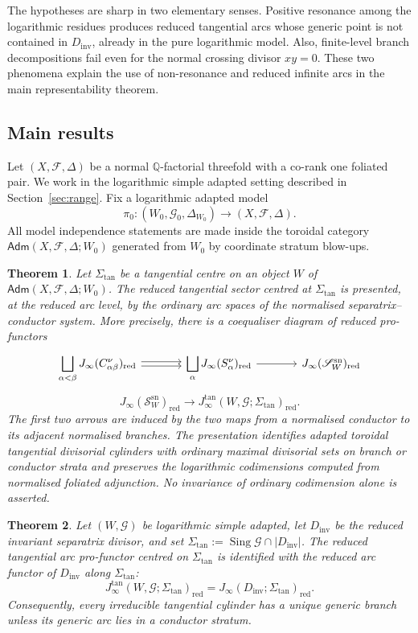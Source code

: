 \documentclass[11pt]{amsart}
\numberwithin{equation}{section}
\theoremstyle{plain}
\newtheorem{Theorem}{Theorem}[section]
\theoremstyle{definition}
\newcommand{\Sing}{\operatorname{Sing}}
\newcommand{\sn}{\mathrm{sn}}
\newcommand{\Sigmatan}{\Sigma_{\mathrm{tan}}}
\newcommand{\Adm}{\mathsf{Adm}}
\newcommand{\red}{\mathrm{red}}
\newcommand{\Dinv}{D_{\mathrm{inv}}}
\newcommand{\bQ}{\mathbb Q}
\newcommand{\cF}{\mathcal F}
\newcommand{\cG}{\mathcal G}
\newcommand{\sS}{\mathscr S}
\begin{document}
The hypotheses are sharp in two elementary senses.  Positive resonance among
the logarithmic residues produces reduced tangential arcs whose generic point
is not contained in \(\Dinv\), already in the pure logarithmic model.  Also,
finite-level branch decompositions fail even for the normal crossing divisor
\(xy=0\).  These two phenomena explain the use of non-resonance and reduced
infinite arcs in the main representability theorem.

\subsection*{Main results}

Let $(X,\cF,\Delta)$ be a normal $\bQ$-factorial threefold with a co-rank one
foliated pair.  We work in the logarithmic simple adapted setting described
in Section~\ref{sec:range}.  Fix a logarithmic adapted model
\[
\pi_0:(W_0,\cG_0,\Delta_{W_0})\to (X,\cF,\Delta).
\]
All model independence statements are made inside the toroidal category
$\Adm(X,\cF,\Delta;W_0)$ generated from $W_0$ by coordinate stratum blow-ups.

\begin{Theorem}
\label{thm:intro-canonical-model}
Let $\Sigmatan$ be a tangential centre on an object $W$ of
$\Adm(X,\cF,\Delta;W_0)$.  The reduced tangential sector centred at
$\Sigmatan$ is presented, at the reduced arc level, by the ordinary arc
spaces of the normalised separatrix--conductor system.  More precisely, there is a coequaliser diagram
of reduced pro-functors
\[
\begin{tikzcd}[column sep=large]
\displaystyle\bigsqcup_{\alpha<\beta}J_\infty(C_{\alpha\beta}^{\nu})_{\red}
\arrow[r, shift left=.45ex]
\arrow[r, shift right=.45ex]
&
\displaystyle\bigsqcup_\alpha J_\infty(S_\alpha^\nu)_{\red}
\arrow[r]
&J_\infty(\sS_W^{\sn})_{\red}
\end{tikzcd}
\]
\[
J_\infty(\sS_W^{\sn})_{\red}
\longrightarrow
J_\infty^{\tan}(W,\cG;\Sigmatan)_{\red}.
\]
The first two arrows are induced by the two maps from a normalised conductor
to its adjacent normalised branches.  The presentation identifies adapted
toroidal tangential divisorial cylinders with ordinary maximal divisorial sets
on branch or conductor strata and preserves the logarithmic codimensions
computed from normalised foliated adjunction.  No invariance of ordinary
codimension alone is asserted.
\end{Theorem}

\begin{Theorem}
\label{thm:intro-formal}
Let $(W,\cG)$ be logarithmic simple adapted, let $\Dinv$ be the reduced
invariant separatrix divisor, and set
$\Sigmatan:=\Sing\cG\cap |\Dinv|$.  The reduced tangential arc
pro-functor centred on $\Sigmatan$ is identified with the reduced arc
functor of $\Dinv$ along $\Sigmatan$:
\[
J_\infty^{\tan}(W,\cG;\Sigmatan)_{\red}=J_\infty(\Dinv;\Sigmatan)_{\red}.
\]
Consequently, every irreducible tangential cylinder has a unique generic
branch unless its generic arc lies in a conductor stratum.
\end{Theorem}
\end{document}
